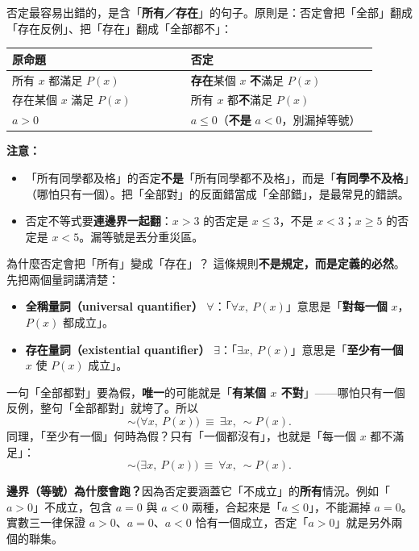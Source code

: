\documentclass[11pt]{article}
\begin{document}
否定最容易出錯的，是含「\textbf{所有／存在}」的句子。原則是：否定會把「全部」翻成「存在反例」、把「存在」翻成「全部都不」：

\begin{center}
\renewcommand{\arraystretch}{1.35}
\begin{tabular}{p{0.44\linewidth} p{0.46\linewidth}}
\hline
\textbf{原命題} & \textbf{否定} \\
\hline
所有 $x$ 都滿足 $P(x)$ & \textbf{存在}某個 $x$ \textbf{不}滿足 $P(x)$ \\
存在某個 $x$ 滿足 $P(x)$ & 所有 $x$ 都\textbf{不}滿足 $P(x)$ \\
$a>0$ & $a\le0$（\textbf{不是} $a<0$，別漏掉等號） \\
\hline
\end{tabular}
\end{center}

\textbf{注意：}
\begin{itemize}\setlength{\itemsep}{1pt}
\item 「所有同學都及格」的否定\textbf{不是}「所有同學都不及格」，而是「\textbf{有同學不及格}」（哪怕只有一個）。把「全部對」的反面錯當成「全部錯」，是最常見的錯誤。
\item 否定不等式要\textbf{連邊界一起翻}：$x>3$ 的否定是 $x\le3$，不是 $x<3$；$x\ge5$ 的否定是 $x<5$。漏等號是丟分重災區。
\end{itemize}

\begin{補充框}{為什麼否定會把「所有」變成「存在」？}
這條規則\textbf{不是規定，而是定義的必然}。先把兩個量詞講清楚：
\begin{itemize}\setlength{\itemsep}{1pt}
\item \textbf{全稱量詞（universal quantifier）} $\forall$：「$\forall x,\ P(x)$」意思是「\textbf{對每一個} $x$，$P(x)$ 都成立」。
\item \textbf{存在量詞（existential quantifier）} $\exists$：「$\exists x,\ P(x)$」意思是「\textbf{至少有一個} $x$ 使 $P(x)$ 成立」。
\end{itemize}

一句「全部都對」要為假，\textbf{唯一}的可能就是「\textbf{有某個 $x$ 不對}」——哪怕只有一個反例，整句「全部都對」就垮了。所以
$$
\sim\bigl(\forall x,\ P(x)\bigr)\ \equiv\ \exists x,\ \sim P(x).
$$
同理，「至少有一個」何時為假？只有「一個都沒有」，也就是「每一個 $x$ 都不滿足」：
$$
\sim\bigl(\exists x,\ P(x)\bigr)\ \equiv\ \forall x,\ \sim P(x).
$$

\textbf{邊界（等號）為什麼會跑？}因為否定要涵蓋它「不成立」的\textbf{所有}情況。例如「$a>0$」不成立，包含 $a=0$ 與 $a<0$ 兩種，合起來是「$a\le0$」，不能漏掉 $a=0$。實數三一律保證 $a>0$、$a=0$、$a<0$ 恰有一個成立，否定「$a>0$」就是另外兩個的聯集。
\end{補充框}
\end{document}
